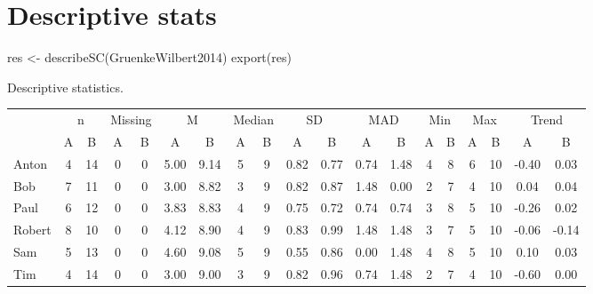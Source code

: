\documentclass[
]{book}
\newenvironment{Shaded}{\begin{snugshade}}{\end{snugshade}}
\newcommand{\FunctionTok}[1]{\textcolor[rgb]{0.00,0.00,0.00}{#1}}
\newcommand{\NormalTok}[1]{#1}
\newcommand{\OtherTok}[1]{\textcolor[rgb]{0.56,0.35,0.01}{#1}}
\begin{document}
\hypertarget{descriptive-stats}{%
\section{Descriptive stats}\label{descriptive-stats}}

\begin{Shaded}
\begin{Highlighting}[]
\NormalTok{res }\OtherTok{\textless{}{-}} \FunctionTok{describeSC}\NormalTok{(GruenkeWilbert2014)}
\FunctionTok{export}\NormalTok{(res)}
\end{Highlighting}
\end{Shaded}

Descriptive statistics.

\begin{table}
\centering
\begin{tabular}{lcccccccccccccccccc}
\toprule
\multicolumn{1}{c}{ } & \multicolumn{2}{c}{n} & \multicolumn{2}{c}{Missing} & \multicolumn{2}{c}{M} & \multicolumn{2}{c}{Median} & \multicolumn{2}{c}{SD} & \multicolumn{2}{c}{MAD} & \multicolumn{2}{c}{Min} & \multicolumn{2}{c}{Max} & \multicolumn{2}{c}{Trend} \\
\cmidrule(l{3pt}r{3pt}){2-3} \cmidrule(l{3pt}r{3pt}){4-5} \cmidrule(l{3pt}r{3pt}){6-7} \cmidrule(l{3pt}r{3pt}){8-9} \cmidrule(l{3pt}r{3pt}){10-11} \cmidrule(l{3pt}r{3pt}){12-13} \cmidrule(l{3pt}r{3pt}){14-15} \cmidrule(l{3pt}r{3pt}){16-17} \cmidrule(l{3pt}r{3pt}){18-19}
  & A & B & A & B & A & B & A & B & A & B & A & B & A & B & A & B & A & B\\
\midrule
Anton & 4 & 14 & 0 & 0 & 5.00 & 9.14 & 5 & 9 & 0.82 & 0.77 & 0.74 & 1.48 & 4 & 8 & 6 & 10 & -0.40 & 0.03\\
Bob & 7 & 11 & 0 & 0 & 3.00 & 8.82 & 3 & 9 & 0.82 & 0.87 & 1.48 & 0.00 & 2 & 7 & 4 & 10 & 0.04 & 0.04\\
Paul & 6 & 12 & 0 & 0 & 3.83 & 8.83 & 4 & 9 & 0.75 & 0.72 & 0.74 & 0.74 & 3 & 8 & 5 & 10 & -0.26 & 0.02\\
Robert & 8 & 10 & 0 & 0 & 4.12 & 8.90 & 4 & 9 & 0.83 & 0.99 & 1.48 & 1.48 & 3 & 7 & 5 & 10 & -0.06 & -0.14\\
Sam & 5 & 13 & 0 & 0 & 4.60 & 9.08 & 5 & 9 & 0.55 & 0.86 & 0.00 & 1.48 & 4 & 8 & 5 & 10 & 0.10 & 0.03\\
\addlinespace
Tim & 4 & 14 & 0 & 0 & 3.00 & 9.00 & 3 & 9 & 0.82 & 0.96 & 0.74 & 1.48 & 2 & 7 & 4 & 10 & -0.60 & 0.00\\
\bottomrule
\end{tabular}
\end{table}
\end{document}
